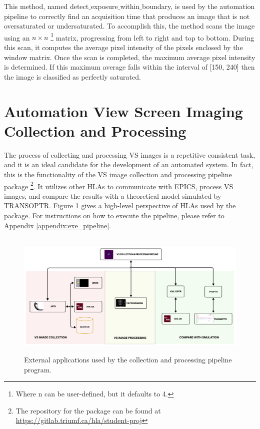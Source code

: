 \documentclass{article}
\begin{document}
This method, named detect$\_$exposure$\_$within$\_$boundary, is used by the automation pipeline to correctly find an acquisition time that produces an image that is not oversaturated or undersaturated. To accomplish this, the method scans the image using an $n \times n$ \footnote{Where n can be user-defined, but it defaults to 4.} matrix, progressing from left to right and top to bottom. During this scan, it computes the average pixel intensity of the pixels enclosed by the window matrix. Once the scan is completed, the maximum average pixel intensity is determined. If this maximum average falls within the interval of [150, 240] then the image is classified as perfectly saturated.   

\section{Automation View Screen Imaging Collection and Processing}

The process of collecting and processing VS images is a repetitive consistent task, and it is an ideal candidate for the development of an automated system. In fact, this is the functionality of the VS image collection and processing pipeline package \footnote{The repository for the package can be found at \url{https://gitlab.triumf.ca/hla/student-proj}}. It utilizes other HLAs to communicate with EPICS, process VS images, and compare the results with a theoretical model simulated by TRANSOPTR. Figure \ref{fig:13} gives a high-level perspective of HLAs used by the package. For instructions on how to execute the pipeline, please refer to Appendix \ref{appendix:exe_pipeline}.

\begin{figure}[!h]  
    \centerline{\ \includegraphics[width=1.13\linewidth]{images/hla.png}}
    \caption{External applications used by the collection and processing pipeline program. }
    \label{fig:13}
\end{figure} 
\end{document}
